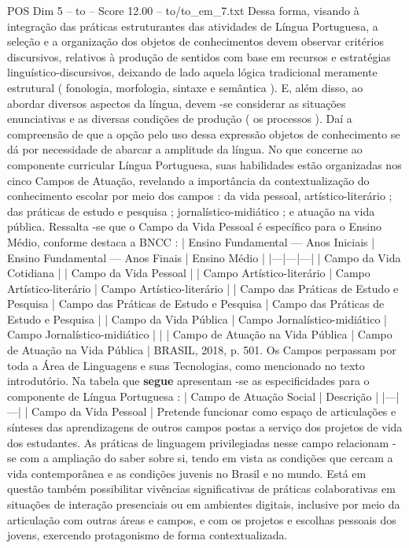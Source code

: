 \begin{textsample}{POS Dim 5 – to – Score 12.00 – to/to\_em\_7.txt}
Dessa forma, visando à integração das práticas estruturantes das atividades de Língua Portuguesa, a seleção e a organização dos objetos de conhecimentos devem observar critérios discursivos, relativos à produção de sentidos com base em recursos e estratégias linguístico-discursivos, deixando de lado aquela lógica tradicional meramente estrutural ( fonologia, morfologia, sintaxe e semântica ).
E, além disso, ao abordar diversos aspectos da língua, devem -se considerar as situações enunciativas e as diversas condições de produção ( os processos ).
Daí a compreensão de que a opção pelo uso dessa expressão objetos de conhecimento se dá por necessidade de abarcar a amplitude da língua.
No que concerne ao componente curricular Língua Portuguesa, suas habilidades estão organizadas nos cinco Campos de Atuação, revelando a importância da contextualização do conhecimento escolar por meio dos campos : da vida pessoal, artístico-literário ; das práticas de estudo e pesquisa ; jornalístico-midiático ; e atuação na vida pública.
Ressalta -se que o Campo da Vida Pessoal é específico para o Ensino Médio, conforme destaca a BNCC : | Ensino Fundamental — Anos Iniciais | Ensino Fundamental — Anos Finais | Ensino Médio | |---|---|---| | Campo da Vida Cotidiana | | Campo da Vida Pessoal | | Campo Artístico-literário | Campo Artístico-literário | Campo Artístico-literário | | Campo das Práticas de Estudo e Pesquisa | Campo das Práticas de Estudo e Pesquisa | Campo das Práticas de Estudo e Pesquisa | | Campo da Vida Pública | Campo Jornalístico-midiático | Campo Jornalístico-midiático | | | Campo de Atuação na Vida Pública | Campo de Atuação na Vida Pública | BRASIL, 2018, p. 501.
Os Campos perpassam por toda a Área de Linguagens e suas Tecnologias, como mencionado no texto introdutório.
Na tabela que \textbf{segue} apresentam -se as especificidades para o componente de Língua Portuguesa : | Campo de Atuação Social | Descrição | |---|---| | Campo da Vida Pessoal | Pretende funcionar como espaço de articulações e sínteses das aprendizagens de outros campos postas a serviço dos projetos de vida dos estudantes.
As práticas de linguagem privilegiadas nesse campo relacionam -se com a ampliação do saber sobre si, tendo em vista as condições que cercam a vida contemporânea e as condições juvenis no Brasil e no mundo.
Está em questão também possibilitar vivências significativas de práticas colaborativas em situações de interação presenciais ou em ambientes digitais, inclusive por meio da articulação com outras áreas e campos, e com os projetos e escolhas pessoais dos jovens, exercendo protagonismo de forma contextualizada.

\end{textsample}
